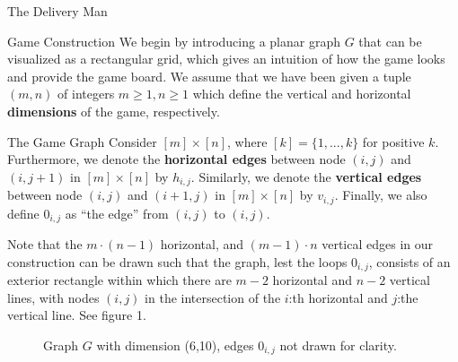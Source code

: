 \begin{section}{The Delivery Man}
  \newpage
  \begin{subsection}{Game Construction}
    We begin by introducing a planar graph $G$ that can be visualized as a rectangular grid, which gives an intuition of how the game looks and provide the game board. We assume that we have been given a tuple $(m, n)$ of integers $m \geq 1, n \geq 1$ which define the vertical and horizontal \textbf{dimensions} of the game, respectively.
    
    \begin{subsubsection}{The Game Graph}
    Consider $[m]\times [n]$, where $[k] = \{1, ..., k\}$ for positive $k$. Furthermore, we denote the \textbf{horizontal edges} between node $(i, j)$ and $(i, j+1)$ in $[m] \times [n]$ by $h_{i,j}$. Similarly, we denote the \textbf{vertical edges} between node $(i, j)$ and $(i+1, j)$ in $[m] \times [n]$ by $v_{i,j}$. Finally, we also define $0_{i,j}$ as ``the edge'' from $(i,j)$ to $(i,j)$. 

    Note that the $m\cdot (n-1)$ horizontal, and $(m-1)\cdot n$ vertical edges in our construction can be drawn such that the graph, lest the loops $0_{i,j}$, consists of an exterior rectangle within which there are $m-2$ horizontal and $n-2$ vertical lines, with nodes $(i, j)$ in the intersection of the $i$:th horizontal and $j$:the vertical line. See figure 1.

      \begin{figure}[H]
        \label{fig:grid}
        \centering
        \caption{Graph $G$ with dimension (6,10), edges $0_{i,j}$ not drawn for clarity.}
      \end{figure}
      

\end{subsubsection}
\end{subsection}
\end{section}
